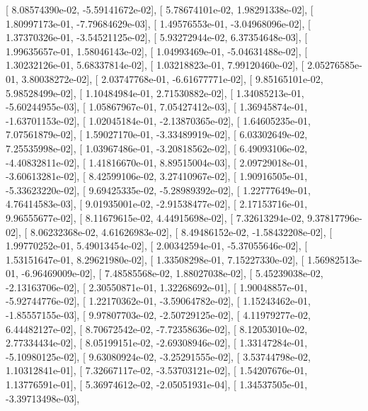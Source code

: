 \documentclass{article}
\begin{document}
       [  8.08574390e-02,  -5.59141672e-02],
       [  5.78674101e-02,   1.98291338e-02],
       [  1.80997173e-01,  -7.79684629e-03],
       [  1.49576553e-01,  -3.04968096e-02],
       [  1.37370326e-01,  -3.54521125e-02],
       [  5.93272944e-02,   6.37354648e-03],
       [  1.99635657e-01,   1.58046143e-02],
       [  1.04993469e-01,  -5.04631488e-02],
       [  1.30232126e-01,   5.68337814e-02],
       [  1.03218823e-01,   7.99120460e-02],
       [  2.05276585e-01,   3.80038272e-02],
       [  2.03747768e-01,  -6.61677771e-02],
       [  9.85165101e-02,   5.98528499e-02],
       [  1.10484984e-01,   2.71530882e-02],
       [  1.34085213e-01,  -5.60244955e-03],
       [  1.05867967e-01,   7.05427412e-03],
       [  1.36945874e-01,  -1.63701153e-02],
       [  1.02045184e-01,  -2.13870365e-02],
       [  1.64605235e-01,   7.07561879e-02],
       [  1.59027170e-01,  -3.33489919e-02],
       [  6.03302649e-02,   7.25535998e-02],
       [  1.03967486e-01,  -3.20818562e-02],
       [  6.49093106e-02,  -4.40832811e-02],
       [  1.41816670e-01,   8.89515004e-03],
       [  2.09729018e-01,  -3.60613281e-02],
       [  8.42599106e-02,   3.27410967e-02],
       [  1.90916505e-01,  -5.33623220e-02],
       [  9.69425335e-02,  -5.28989392e-02],
       [  1.22777649e-01,   4.76414583e-03],
       [  9.01935001e-02,  -2.91538477e-02],
       [  2.17153716e-01,   9.96555677e-02],
       [  8.11679615e-02,   4.44915698e-02],
       [  7.32613294e-02,   9.37817796e-02],
       [  8.06232368e-02,   4.61626983e-02],
       [  8.49486152e-02,  -1.58432208e-02],
       [  1.99770252e-01,   5.49013454e-02],
       [  2.00342594e-01,  -5.37055646e-02],
       [  1.53151647e-01,   8.29621980e-02],
       [  1.33508298e-01,   7.15227330e-02],
       [  1.56982513e-01,  -6.96469009e-02],
       [  7.48585568e-02,   1.88027038e-02],
       [  5.45239038e-02,  -2.13163706e-02],
       [  2.30550871e-01,   1.32268692e-01],
       [  1.90048857e-01,  -5.92744776e-02],
       [  1.22170362e-01,  -3.59064782e-02],
       [  1.15243462e-01,  -1.85557155e-03],
       [  9.97807703e-02,  -2.50729125e-02],
       [  4.11979277e-02,   6.44482127e-02],
       [  8.70672542e-02,  -7.72358636e-02],
       [  8.12053010e-02,   2.77334434e-02],
       [  8.05199151e-02,  -2.69308946e-02],
       [  1.33147284e-01,  -5.10980125e-02],
       [  9.63080924e-02,  -3.25291555e-02],
       [  3.53744798e-02,   1.10312841e-01],
       [  7.32667117e-02,  -3.53703121e-02],
       [  1.54207676e-01,   1.13776591e-01],
       [  5.36974612e-02,  -2.05051931e-04],
       [  1.34537505e-01,  -3.39713498e-03],
\end{document}
